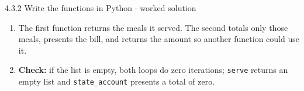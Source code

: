 \documentclass[11pt]{article}
\begin{document}
\begin{keepsection}
\begin{workedbox}{4.3.2 Write the functions in Python \ensuremath{\cdot} worked solution}
\begin{enumerate}
\begin{tcolorbox}[colback=Paperblue,colframe=Paperblue,boxrule=0pt,arc=0pt,left=7pt,right=7pt,top=5pt,bottom=5pt]
\noindent\hspace*{1em}\texttt{total = 0}\par
\noindent\hspace*{1em}\texttt{for meal\_id in served\_meals:}\par
\noindent\hspace*{3em}\texttt{total += price\_for(meal\_id)}\par
\noindent\hspace*{1em}\texttt{present\_bill(customer, total)}\par
\noindent\hspace*{1em}\texttt{return total}\par
\end{tcolorbox}
\item The first function returns the meals it served. The second totals only those meals, presents the bill, and returns the amount so another function could use it.
\item \textbf{Check:} if the list is empty, both loops do zero iterations; \texttt{serve} returns an empty list and \texttt{state\_account} presents a total of zero.
\end{enumerate}
\end{workedbox}

\end{keepsection}
\end{document}
